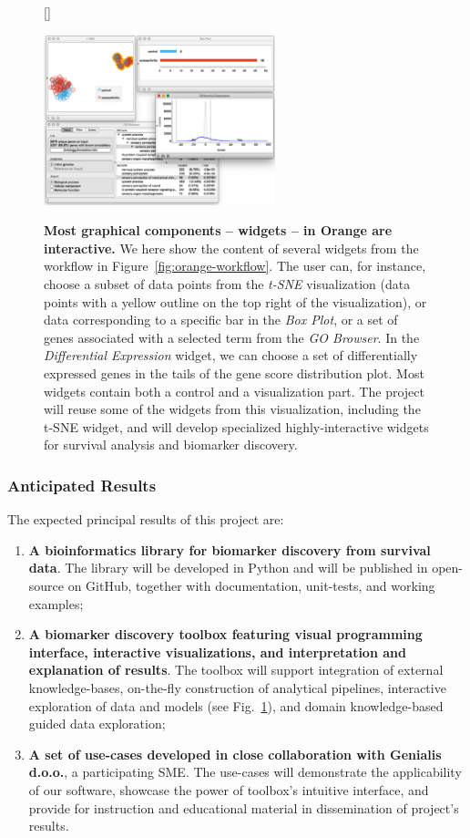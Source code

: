\documentclass[11pt,a4paper]{article}
\renewcommand{\bold}{\textbf}
\begin{document}
\begin{figure}[htbp]
[\FBwidth]
{\caption{\small\bold{Most graphical components -- widgets -- in Orange are interactive.} We here show the content of several widgets from the workflow in Figure~\ref{fig:orange-workflow}. The user can, for instance, choose a subset of data points from the {\em t-SNE} visualization (data points with a yellow outline on the top right of the visualization), or data corresponding to a specific bar in the {\em Box Plot}, or a set of genes associated with a selected term from the {\em GO Browser}. In the {\em Differential Expression} widget, we can choose a set of differentially expressed genes in the tails of the gene score distribution plot. Most widgets contain both a control and a visualization part. The project will reuse some of the widgets from this visualization, including the t-SNE widget, and will develop specialized highly-interactive widgets for survival analysis and biomarker discovery.}
\label{fig:orange-interactivity}}
{\includegraphics[width=0.6\textwidth]{orange-interactivity}}
\end{figure}

\subsubsection*{Anticipated Results}
The expected principal results of this project are:
\begin{enumerate}
	\item \bold{A bioinformatics library for biomarker discovery from survival data}. The library will be developed in Python and will be published in open-source on GitHub, together with documentation, unit-tests, and working examples;
	\item \bold{A biomarker discovery toolbox featuring visual programming interface, interactive visualizations, and interpretation and explanation of results}. The toolbox will support integration of external knowledge-bases, on-the-fly construction of analytical pipelines, interactive exploration of data and models (see Fig.~\ref{fig:orange-interactivity}), and domain knowledge-based guided data exploration;
	\item \bold{A set of use-cases developed in close collaboration with Genialis d.o.o.}, a participating SME. The use-cases will demonstrate the applicability of our software, showcase the power of toolbox's intuitive interface, and provide for instruction and educational material in dissemination of project's results.
\end{enumerate}
\end{document}
